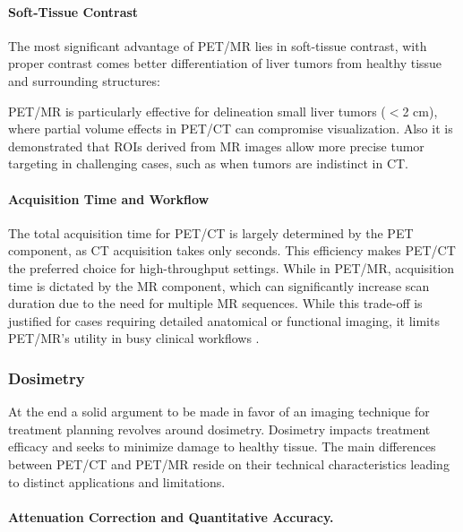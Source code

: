 \paragraph{Soft-Tissue Contrast}

The most significant advantage of PET/MR lies in soft-tissue contrast, with proper contrast comes better differentiation of liver tumors from healthy tissue and surrounding structures:

PET/MR is particularly effective for delineation small liver tumors ($<$2 cm), where partial volume effects in PET/CT can compromise visualization. \cite{knesaurek2018} Also it is demonstrated that ROIs derived from MR images allow more precise tumor targeting in challenging cases, such as when tumors are indistinct in CT. %


\paragraph{Acquisition Time and Workflow}

The total acquisition time for PET/CT is largely determined by the PET component, as CT acquisition takes only seconds. This efficiency makes PET/CT the preferred choice for high-throughput settings\cite{knesaurek2018}.
While in PET/MR, acquisition time is dictated by the MR component, which can significantly increase scan duration due to the need for multiple MR sequences. %
While this trade-off is justified for cases requiring detailed anatomical or functional imaging, it limits PET/MR’s utility in busy clinical workflows \cite{knesaurek2018}.


\subsubsection*{Dosimetry}
At the end a solid argument to be made in favor of an imaging technique for treatment planning revolves around dosimetry. Dosimetry impacts treatment efficacy and seeks to minimize damage to healthy tissue. The main differences between PET/CT and PET/MR reside on their technical characteristics leading to distinct applications and limitations.

\paragraph{Attenuation Correction and Quantitative Accuracy.}

